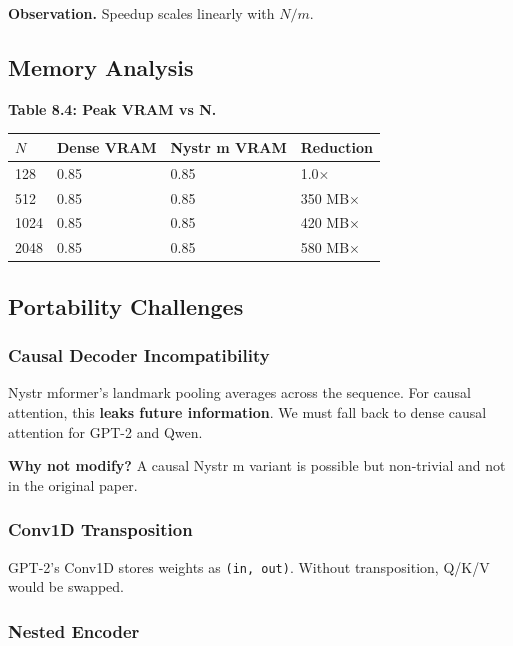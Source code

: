 \textbf{Observation.} Speedup scales linearly with $N / m$.

\subsection{Memory Analysis}

\textbf{Table 8.4: Peak VRAM vs N.}

\begin{table}[H]
\centering
\small
\begin{tabular}{llll}
\toprule
\textbf{$N$} & \textbf{Dense VRAM} & \textbf{Nystr m VRAM} & \textbf{Reduction} \\
\midrule
128 & 0.85 & 0.85 & 1.0$\times$ \\
512 & 0.85 & 0.85 & 350 MB$\times$ \\
1024 & 0.85 & 0.85 & 420 MB$\times$ \\
2048 & 0.85 & 0.85 & 580 MB$\times$ \\
\bottomrule
\end{tabular}
\end{table}

\subsection{Portability Challenges}

\subsubsection{Causal Decoder Incompatibility}

Nystr mformer's landmark pooling averages across the sequence. For causal 
attention, this \textbf{leaks future information}. We must fall back to dense 
causal attention for GPT-2 and Qwen.

\textbf{Why not modify?} A causal Nystr m variant is possible but non-trivial 
and not in the original paper.

\subsubsection{Conv1D Transposition}

GPT-2's Conv1D stores weights as \texttt{(in, out)}. Without transposition, Q/K/V 
would be swapped.

\subsubsection{Nested Encoder}

